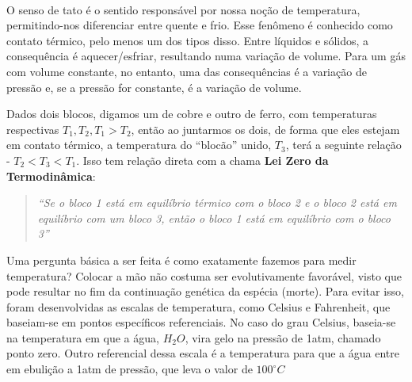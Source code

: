 \documentclass{article}
\begin{document}
\paragraph{} O senso de tato é o sentido responsável por nossa noção de temperatura, permitindo-nos diferenciar
entre quente e frio. Esse fenômeno é conhecido como contato térmico, pelo menos um dos tipos disso. Entre líquidos e sólidos,
a consequência é aquecer/esfriar, resultando numa variação de volume. Para um gás com volume constante, no entanto, uma
das consequências é a variação de pressão e, se a pressão for constante, é a variação de volume.

  Dados dois blocos, digamos um de cobre e outro de ferro, com temperaturas respectivas \(T_{1}, T_{2}, T_{1} > T_{2}\), então ao
juntarmos os dois, de forma que eles estejam em contato térmico, a temperatura do ``blocão'' unido, \(T_{3}\), terá a seguinte relação -
 \(T_{2} < T_{3} < T_{1}\). Isso tem relação direta com a chama \textbf{Lei Zero da Termodinâmica}:
 \begin{quote}
 \textit{``Se o bloco 1 está em equilíbrio térmico com o bloco 2 e o bloco 2 está em equilíbrio com um bloco 3, então
o bloco 1 está em equilíbrio com o bloco 3''}
 \end{quote}
 Uma pergunta básica a ser feita é como exatamente fazemos para medir temperatura? Colocar a mão não costuma ser evolutivamente favorável, visto que pode resultar
no fim da continuação genética da espécia (morte). Para evitar isso, foram desenvolvidas as escalas de temperatura, como Celsius e Fahrenheit, que baseiam-se 
em pontos específicos referenciais. No caso do grau Celsius, baseia-se na temperatura em que a água, \(H_{2}O\), vira gelo na pressão de 1atm, chamado ponto zero.
Outro referencial dessa escala é a temperatura para que a água entre em ebulição a 1atm de pressão, que leva o valor de \(100^{\circ{}}C\)
\end{document}
